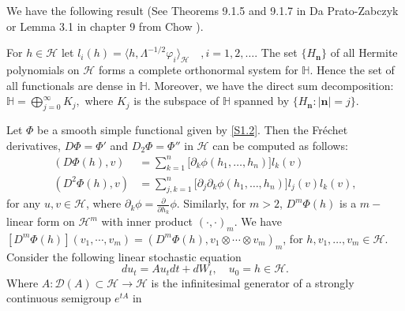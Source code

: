 \documentclass[review,onefignum,onetabnum]{siamart190516}
\begin{document}
        We have the following result (See Theorems 9.1.5 and 9.1.7 in Da
    Prato-Zabczyk \cite{da-za} or Lemma 3.1 in chapter 9 from Chow \cite{liu}).

    \begin{lemma}\label{s1.le1}
            For 
        $ h \in \mathcal{H} $ let 
        $
            l_i(h)
                =\langle 
                    h, \Lambda^{-1/2}\varphi_i
                 \rangle_\mathcal{H}
            \quad, i=1,2,\ldots
        $. The set $\{H_{\bm{n}}\}$ of all
        Hermite polynomials on $\mathcal{H} $ forms a complete orthonormal 
        system for $\mathbb{H} $. Hence the set of all functionals are dense in
        $\mathbb{H}$. Moreover, we have the direct sum decomposition:
        $
            \mathbb{H} = \bigoplus_{j=0}^\infty K_j,
        $
        where $K_j$ is the subspace of $\mathbb{H} $ spanned by 
        $\{H_{\bm{n}}: |\bm{n}|=j\}$.
    \end{lemma}
%
    Let $\Phi$ be a smooth simple functional given by \eqref{S1.2}. 
    Then the Fr\'echet derivatives, $D \Phi = \Phi'$ and 
    $D_2 \Phi = \Phi''$ in $\mathcal{H}$ can be computed as follows:
    \begin{equation}
        \label{s1.3}
        \begin{aligned}
            (D \Phi(h), v)
            &=
                \sum_{k=1}^n \big[\partial_k \phi(h_1,\ldots,h_n)\big]
                l_k(v)\nonumber
            \\
            (D^2 \Phi(h), v)
            &=
                \sum_{j,k=1}^n \big[\partial_j\partial_k
                \phi(h_1,\ldots,h_n)\big] l_j(v) l_k(v),
        \end{aligned}
    \end{equation}
    for any $u, v \in \mathcal{H}$, where
    $\partial_k \phi= \frac{\partial}{\partial h_k} \phi$.
    Similarly, for $m > 2$, $D^m \Phi(h)$ is a $m-$linear form on
    $\mathcal{H}^m$
    with inner product $(\cdot,\cdot)_m$.
    We have
    $
        [D^m\Phi(h) ](v_1 , \cdots, v_m )
            = (D^m \Phi(h), v_1 \otimes \cdots \otimes v_m )_m
    $,
    for $h, v_1 , \ldots , v_m \in \mathcal{H}$.
    Consider the following linear stochastic equation
    \begin{equation}
        \label{OU}
        du_t=Au_tdt+dW_t, \quad 
        u_0=h\in \mathcal{H}.
    \end{equation}
    Where $A: \mathcal{D}(A) \subset \mathcal{H} \rightarrow \mathcal{H}$ is the
    infinitesimal generator of a strongly continuous semigroup $e^{tA}$ in
\end{document}
